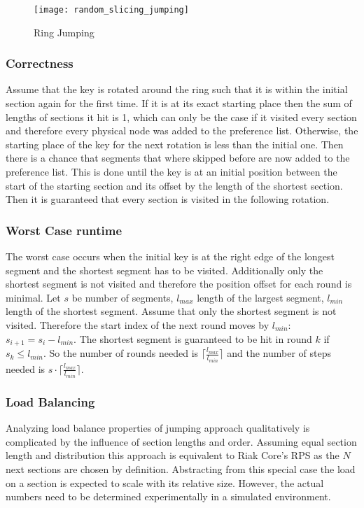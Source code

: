 \begin{figure}
\centering
\texttt{[image: random\_slicing\_jumping]}
\caption{Ring Jumping}
\label{fig:ring_jumping}
\end{figure}

\subsubsection{Correctness}
Assume that the key is rotated around the ring such that it is within the initial section again for the first time.
If it is at its exact starting place then the sum of lengths of sections it hit is 1, which can only be the case if it visited every section and therefore every physical node was added to the preference list.
Otherwise, the starting place of the key for the next rotation is less than the initial one.
Then there is a chance that segments that where skipped before are now added to the preference list.
This is done until the key is at an initial position between the start of the starting section and its offset by the length of the shortest section.
Then it is guaranteed that every section is visited in the following rotation.

\subsubsection{Worst Case runtime}
The worst case occurs when the initial key is at the right edge of the longest segment and the shortest segment has to be visited.
Additionally only the shortest segment is not visited and therefore the position offset for each round is minimal.
Let $s$ be number of segments, $l_{max}$ length of the largest segment, $l_{min}$ length of the shortest segment.
Assume that only the shortest segment is not visited.
Therefore the start index of the next round moves by $l_{min}$: $s_{i+1} = s_{i} - l_{min}$.
The shortest segment is guaranteed to be hit in round $k$ if $s_k \leq l_{min}$.
So the number of rounds needed is $\lceil\frac{l_{max}}{l_{min}}\rceil$ and the number of steps needed is $s\cdot\lceil\frac{l_{max}}{l_{min}}\rceil$.

\subsubsection{Load Balancing}
Analyzing load balance properties of jumping approach qualitatively is complicated by the influence of section lengths and order.
Assuming equal section length and distribution this approach is equivalent to Riak Core's \ac{RPS} as the $N$ next sections are chosen by definition.
Abstracting from this special case the load on a section is expected to scale with its relative size.
However, the actual numbers need to be determined experimentally in a simulated environment.

